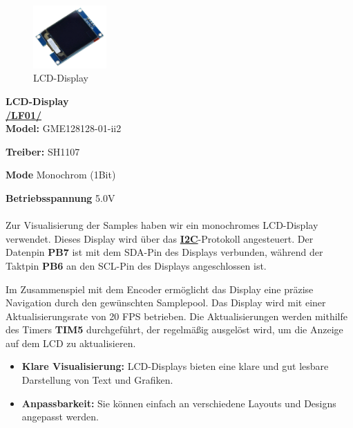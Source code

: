 \vspace{2em}

\begin{figure} %
	\vspace{-20pt + 0.02\textwidth}
	\hspace{0.06\textwidth} %
	\includegraphics[width=0.25\textwidth]{images/05_technische_spezifikation/Interface/Display.png} %
	\caption{LCD-Display}
	\label{fig:lcd_display}
	\vspace{-50pt}
\end{figure}

\textbf{\hypertarget{Display}{LCD-Display}} \\

\textbf{\hyperlink{LF01_Link}{/LF01/}} \\

\textbf{Model:} GME128128-01-ii2

\textbf{Treiber:} SH1107

\textbf{Mode} Monochrom (1Bit)

\textbf{Betriebsspannung} 5.0V \\ \\

Zur Visualisierung der Samples haben wir ein monochromes LCD-Display verwendet. Dieses Display wird über das \textbf{\hyperlink{I2C_target}{I2C}}-Protokoll angesteuert. Der Datenpin \textbf{PB7} ist mit dem SDA-Pin des Displays verbunden, während der Taktpin \textbf{PB6} an den SCL-Pin des Displays angeschlossen ist. 
	
Im Zusammenspiel mit dem Encoder ermöglicht das Display eine präzise Navigation durch den gewünschten Samplepool. Das Display wird mit einer Aktualisierungsrate von 20 FPS betrieben. Die Aktualisierungen werden mithilfe des Timers \textbf{TIM5} durchgeführt, der regelmäßig ausgelöst wird, um die Anzeige auf dem LCD zu aktualisieren.
	



\begin{itemize}
	\item \textbf{Klare Visualisierung:} LCD-Displays bieten eine klare und gut lesbare Darstellung von Text und Grafiken.
	\item \textbf{Anpassbarkeit:} Sie können einfach an verschiedene Layouts und Designs angepasst werden.
\end{itemize}

